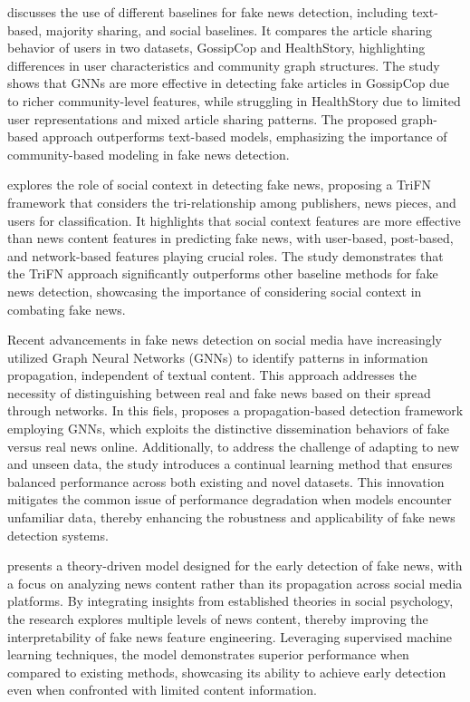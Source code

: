 \documentclass[12pt]{article}
\begin{document}
\cite{chandra2020graphbased} discusses the use of different baselines for fake news detection, including text-based,
majority sharing, and social baselines. It compares the article sharing behavior of users in two datasets,
GossipCop and HealthStory, highlighting differences in user characteristics and community graph structures.
The study shows that GNNs are more effective in detecting fake articles in GossipCop due to richer community-level features,
while struggling in HealthStory due to limited user representations and mixed article sharing patterns.
The proposed graph-based approach outperforms text-based models, emphasizing the importance of community-based modeling in fake news detection.

\cite{shu2018news} explores the role of social context in detecting fake news, proposing a TriFN framework that considers the tri-relationship
among publishers, news pieces, and users for classification. It highlights that social context features are more effective
than news content features in predicting fake news, with user-based, post-based, and network-based features playing crucial roles.
The study demonstrates that the TriFN approach significantly outperforms other baseline methods for fake news detection,
showcasing the importance of considering social context in combating fake news.


Recent advancements in fake news detection on social media have increasingly utilized Graph Neural Networks (GNNs)
to identify patterns in information propagation, independent of textual content. 
This approach addresses the necessity of distinguishing between real and fake news based on their spread through networks. 
In this fiels, \cite{han2020graph} proposes a propagation-based detection framework employing GNNs, 
which exploits the distinctive dissemination behaviors of fake versus real news online. 
Additionally, to address the challenge of adapting to new and unseen data, 
the study introduces a continual learning method that ensures balanced performance across 
both existing and novel datasets. 
This innovation mitigates the common issue of performance degradation when 
models encounter unfamiliar data, thereby 
enhancing the robustness and applicability of fake news detection systems.

\cite{10.1145/3377478} presents a theory-driven model designed for the 
early detection of fake news, with a focus on analyzing news content rather than its propagation 
across social media platforms. By integrating insights from established theories in social 
psychology, the research explores multiple levels of news content, 
thereby improving the interpretability of fake news feature engineering. 
Leveraging supervised machine learning techniques, the model demonstrates superior 
performance when compared to existing methods, 
showcasing its ability to achieve early detection even when confronted with limited content information.
\end{document}
